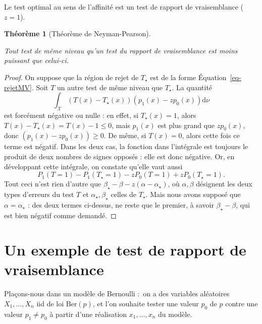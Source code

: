 \documentclass[
  10,
  letterpaper,
  DIV=11,
  numbers=noendperiod]{scrreport}
\theoremstyle{plain}
\newtheorem{theorem}{Théorème}[chapter]
\theoremstyle{definition}
\theoremstyle{plain}
\theoremstyle{definition}
\theoremstyle{definition}
\theoremstyle{plain}
\theoremstyle{remark}
\begin{document}
Le test optimal au sens de l'affinité est un test de rapport de
vraisemblance (\(z=1\)).

\begin{theorem}[Théorème de
Neyman-Pearson]\protect\hypertarget{thm-jerzy}{}\label{thm-jerzy}

Tout test de même niveau qu'un test du rapport de vraisemblance est
moins puissant que celui-ci.

\end{theorem}

\begin{proof}

On suppose que la région de rejet de \(T_\star\) est de la forme
Équation~\ref{eq-rejetMV}. Soit \(T\) un autre test de même niveau que
\(T_\star\). La quantité
\[ \int_{\mathcal{X}} (T(x) - T_\star(x))(p_1(x) - z p_0(x))\mathrm{d}\nu \]
est forcément négative ou nulle : en effet, si \(T_\star(x)=1\), alors
\(T(x)-T_\star(x) = T(x)-1 \leqslant 0\), mais \(p_1(x)\) est plus grand
que \(zp_0(x)\), donc \((p_1(x) - zp_0(x))\geqslant 0\). De même, si
\(T(x) = 0\), alors cette fois ce terme est négatif. Dans les deux cas,
la fonction dans l'intégrale est toujours le produit de deux nombres de
signes opposés : elle est donc négative. Or, en développant cette
intégrale, on constate qu'elle vaut aussi
\[P_1(T=1) - P_1(T_\star=1) - zP_0(T=1)+zP_0(T_\star=1). \] Tout ceci
n'est rien d'autre que \(\beta_\star-\beta - z(\alpha-\alpha_\star)\),
où \(\alpha, \beta\) désignent les deux types d'erreurs du test \(T\) et
\(\alpha_\star, \beta_\star\) celles de \(T_\star\). Mais nous avons
supposé que \(\alpha = \alpha_\star\) : des deux termes ci-dessus, ne
reste que le premier, à savoir \(\beta_\star - \beta\), qui est bien
négatif comme demandé.

\end{proof}

\hypertarget{un-exemple-de-test-de-rapport-de-vraisemblance}{%
\section{Un exemple de test de rapport de
vraisemblance}\label{un-exemple-de-test-de-rapport-de-vraisemblance}}

Plaçons-nous dans un modèle de Bernoulli :~on a des variables aléatoires
\(X_1, \dotsc, X_n\) iid de loi \(\mathrm{Ber}(p)\), et l'on souhaite
tester une valeur \(p_0\) de \(p\) contre une valeur \(p_1 \neq p_0\) à
partir d'une réalisation \(x_1, \dotsc, x_n\) du modèle.
\end{document}
